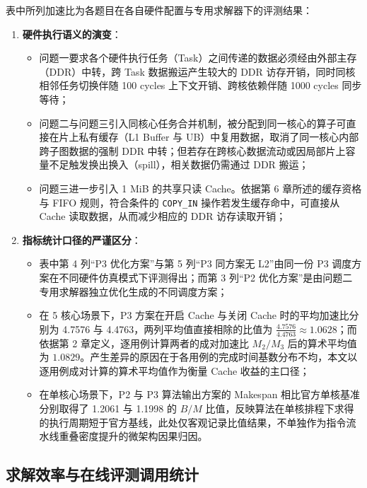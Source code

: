 \documentclass[anonymous,withtoc]{gmcm2026}
\providecommand{\tightlist}{\setlength{\itemsep}{0pt}\setlength{\parskip}{0pt}}
\begin{document}
表中所列加速比为各题目在各自硬件配置与专用求解器下的评测结果：

\begin{enumerate}
\def\labelenumi{\arabic{enumi}.}
\tightlist
\item
  \textbf{硬件执行语义的演变}：

  \begin{itemize}
  \tightlist
  \item
    问题一要求各个硬件执行任务（Task）之间传递的数据必须经由外部主存（DDR）中转，跨 Task 数据搬运产生较大的 DDR 访存开销，同时同核相邻任务切换伴随 100 cycles 上下文开销、跨核依赖伴随 1000 cycles 同步等待；
  \item
    问题二与问题三引入同核心任务合并机制，被分配到同一核心的算子可直接在片上私有缓存（L1 Buffer 与 UB）中复用数据，取消了同一核心内部跨子图数据的强制 DDR 中转；但若存在跨核心数据流动或因局部片上容量不足触发换出换入（spill），相关数据仍需通过 DDR 搬运；
  \item
    问题三进一步引入 1 MiB 的共享只读 Cache。依据第 6 章所述的缓存资格与 FIFO 规则，符合条件的 \texttt{COPY\_IN} 操作若发生缓存命中，可直接从 Cache 读取数据，从而减少相应的 DDR 访存读取开销；
  \end{itemize}
\item
  \textbf{指标统计口径的严谨区分}：

  \begin{itemize}
  \tightlist
  \item
    表中第 4 列``P3 优化方案''与第 5 列``P3 同方案无 L2''由同一份 P3 调度方案在不同硬件仿真模式下评测得出；而第 3 列``P2 优化方案''是由问题二专用求解器独立优化生成的不同调度方案；
  \item
    在 5 核心场景下，P3 方案在开启 Cache 与关闭 Cache 时的平均加速比分别为 4.7576 与 4.4763，两列平均值直接相除的比值为 \(\frac{4.7576}{4.4763} \approx 1.0628\)；而依据第 2 章定义，逐用例计算两者的成对加速比 \(M_2/M_3\) 后的算术平均值为 \(1.0829\)。产生差异的原因在于各用例的完成时间基数分布不均，本文以逐用例成对计算的算术平均值作为衡量 Cache 收益的主口径；
  \item
    在单核心场景下，P2 与 P3 算法输出方案的 Makespan 相比官方单核基准分别取得了 1.2061 与 1.1998 的 \(B/M\) 比值，反映算法在单核排程下求得的执行周期短于官方基线，此处仅客观记录比值结果，不单独作为指令流水线重叠密度提升的微架构因果归因。
  \end{itemize}
\end{enumerate}

\subsection{求解效率与在线评测调用统计}
\end{document}
